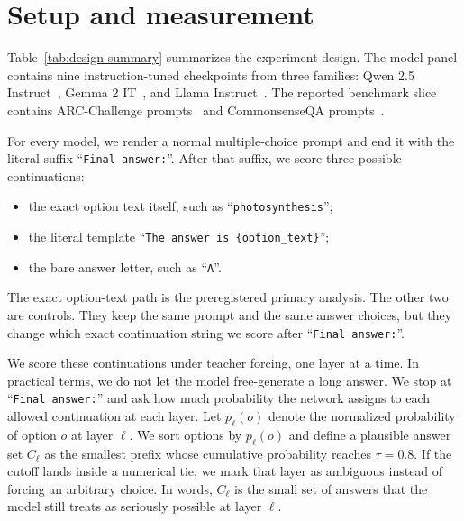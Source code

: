 \section{Setup and measurement}

Table~\ref{tab:design-summary} summarizes the experiment design. The model panel contains
nine instruction-tuned checkpoints from three families: Qwen 2.5 Instruct~\citep{qwen25card},
Gemma 2 IT~\citep{gemma2card}, and Llama Instruct~\citep{llama3herd}. The reported
benchmark slice contains \ArcPromptCount{} ARC-Challenge prompts~\citep{clark2018arc}
and \CsqaPromptCount{} CommonsenseQA prompts~\citep{talmor2019commonsenseqa}.

For every model, we render a normal multiple-choice prompt and end it with the literal
suffix ``\texttt{Final answer:}''. After that suffix, we score three possible continuations:
\begin{itemize}[leftmargin=1.2em, itemsep=0.2em, topsep=0.35em]
\item the exact option text itself, such as ``\texttt{photosynthesis}'';
\item the literal template ``\texttt{The answer is \{option\_text\}}'';
\item the bare answer letter, such as ``\texttt{A}''.
\end{itemize}
The exact option-text path is the preregistered primary analysis. The other two are controls.
They keep the same prompt and the same answer choices, but they change which exact
continuation string we score after ``\texttt{Final answer:}''.

\begin{table}[t]
\centering
\small

\caption{\textbf{Reader-facing summary of the experiment design.} The main question stays fixed throughout the paper: scoring the exact option text is primary, the two alternative continuation strings are controls, and identity versus reverse answer order is kept paired on the same example subset.}
\label{tab:design-summary}
\end{table}

We score these continuations under teacher forcing, one layer at a time. In practical terms,
we do not let the model free-generate a long answer. We stop at ``\texttt{Final answer:}''
and ask how much probability the network assigns to each allowed continuation at each
layer. Let $p_\ell(o)$ denote the normalized probability of option $o$ at layer $\ell$. We
sort options by $p_\ell(o)$ and define a plausible answer set $C_\ell$ as the smallest prefix
whose cumulative probability reaches $\tau = 0.8$. If the cutoff lands inside a numerical tie,
we mark that layer as ambiguous instead of forcing an arbitrary choice. In words, $C_\ell$
is the small set of answers that the model still treats as seriously possible at layer $\ell$.

